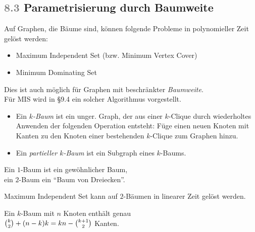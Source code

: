 \documentclass{cheat-sheet}
\newcommand{\scriptSection}[1]{\textcolor{gray}{#1}\enspace}
\begin{document}
\subsection{\scriptSection{8.3} Parametrisierung durch Baumweite}

\begin{motivation}
  Auf Graphen, die Bäume sind, können folgende Probleme in polynomieller Zeit gelöst werden:
  \begin{itemize}
    \item Maximum Independent Set (bzw. Minimum Vertex Cover)
    \item Minimum Dominating Set
  \end{itemize}
  Dies ist auch möglich für Graphen mit beschränkter \textit{Baumweite}. \\
  Für MIS wird in §9.4 ein solcher Algorithmus vorgestellt.
\end{motivation}

\begin{defn}
  \begin{itemize}
    \item
      Ein \emph{$k$-Baum} ist ein unger. Graph, der aus einer $k$-Clique durch wiederholtes Anwenden der folgenden Operation entsteht:
      Füge einen neuen Knoten mit Kanten zu den Knoten einer bestehenden $k$-Clique zum Graphen hinzu.
    \item Ein \emph{partieller $k$-Baum} ist ein Subgraph eines $k$-Baums.
  \end{itemize}
\end{defn}

\begin{bspe}
  \begin{minipage}[t]{0.8 \linewidth}
    Ein $1$-Baum ist ein gewöhnlicher Baum, \\
    ein $2$-Baum ein "`Baum von Dreiecken"'.
  \end{minipage}
\end{bspe}

\begin{lem}
  Maximum Independent Set kann auf $2$-Bäumen in linearer Zeit gelöst werden.
\end{lem}

\begin{lem}
  \begin{minipage}[t]{0.8 \linewidth}
    Ein $k$-Baum mit $n$ Knoten enthält genau \\
    $\tbinom{k}{2} + (n-k) k = k n - \tbinom{k+1}{2}$ Kanten.
  \end{minipage}
\end{lem}
\end{document}
